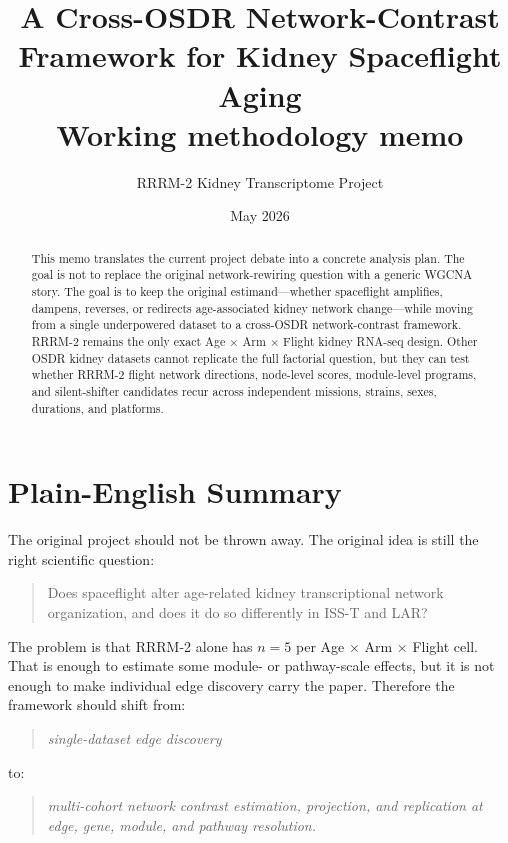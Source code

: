 \documentclass[11pt]{article}
\title{\textbf{A Cross-OSDR Network-Contrast Framework for Kidney Spaceflight Aging}\\
\large Working methodology memo}
\author{RRRM-2 Kidney Transcriptome Project}
\date{May 2026}
\begin{document}
\maketitle

\begin{abstract}
This memo translates the current project debate into a concrete analysis plan.
The goal is not to replace the original network-rewiring question with a generic
WGCNA story. The goal is to keep the original estimand---whether spaceflight
amplifies, dampens, reverses, or redirects age-associated kidney network
change---while moving from a single underpowered dataset to a cross-OSDR
network-contrast framework. RRRM-2 remains the only exact Age $\times$ Arm
$\times$ Flight kidney RNA-seq design. Other OSDR kidney datasets cannot
replicate the full factorial question, but they can test whether RRRM-2 flight
network directions, node-level scores, module-level programs, and silent-shifter
candidates recur across independent missions, strains, sexes, durations, and
platforms.
\end{abstract}

\tableofcontents
\newpage

\section{Plain-English Summary}

The original project should not be thrown away. The original idea is still the
right scientific question:

\begin{quote}
Does spaceflight alter age-related kidney transcriptional network organization,
and does it do so differently in ISS-T and LAR?
\end{quote}

The problem is that RRRM-2 alone has $n=5$ per Age $\times$ Arm $\times$ Flight
cell. That is enough to estimate some module- or pathway-scale effects, but it is
not enough to make individual edge discovery carry the paper. Therefore the
framework should shift from:

\begin{quote}
\emph{single-dataset edge discovery}
\end{quote}

to:

\begin{quote}
\emph{multi-cohort network contrast estimation, projection, and replication at
edge, gene, module, and pathway resolution.}
\end{quote}
\end{document}
